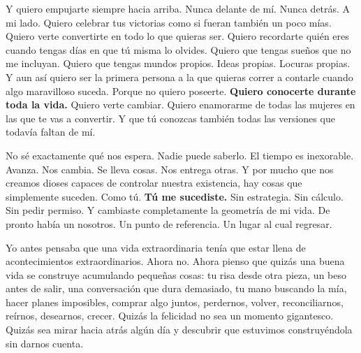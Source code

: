 \documentclass[10pt,twocolumn]{article}
\begin{document}
\begin{list}{}{\setlength{\leftmargin}{2.4cm}\setlength{\rightmargin}{2.4cm}\setlength{\topsep}{0pt}\setlength{\partopsep}{0pt}}
Y quiero empujarte siempre hacia arriba. Nunca delante de mí. Nunca detrás. A mi lado. Quiero celebrar tus victorias como si fueran también un poco mías. Quiero verte convertirte en todo lo que quieras ser. Quiero recordarte quién eres cuando tengas días en que tú misma lo olvides. Quiero que tengas sueños que no me incluyan. Quiero que tengas mundos propios. Ideas propias. Locuras propias. Y aun así quiero ser la primera persona a la que quieras correr a contarle cuando algo maravilloso suceda. Porque no quiero poseerte. \textbf{Quiero conocerte durante toda la vida.} Quiero verte cambiar. Quiero enamorarme de todas las mujeres en las que te vas a convertir. Y que tú conozcas también todas las versiones que todavía faltan de mí.

No sé exactamente qué nos espera. Nadie puede saberlo. El tiempo es inexorable. Avanza. Nos cambia. Se lleva cosas. Nos entrega otras. Y por mucho que nos creamos dioses capaces de controlar nuestra existencia, hay cosas que simplemente suceden. Como tú. \textbf{Tú me sucediste.} Sin estrategia. Sin cálculo. Sin pedir permiso. Y cambiaste completamente la geometría de mi vida. De pronto había un nosotros. Un punto de referencia. Un lugar al cual regresar.

Yo antes pensaba que una vida extraordinaria tenía que estar llena de acontecimientos extraordinarios. Ahora no. Ahora pienso que quizás una buena vida se construye acumulando pequeñas cosas: tu risa desde otra pieza, un beso antes de salir, una conversación que dura demasiado, tu mano buscando la mía, hacer planes imposibles, comprar algo juntos, perdernos, volver, reconciliarnos, reírnos, desearnos, crecer. Quizás la felicidad no sea un momento gigantesco. Quizás sea mirar hacia atrás algún día y descubrir que estuvimos construyéndola sin darnos cuenta.



\end{list}
\end{document}
